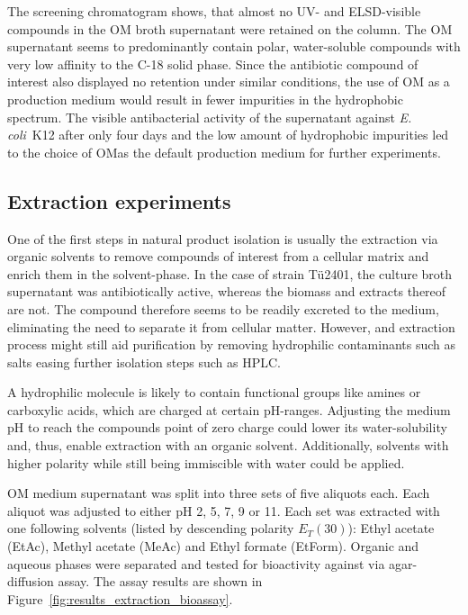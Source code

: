The screening chromatogram shows, that almost no UV- and ELSD-visible compounds in the OM broth supernatant were retained on the column.
The OM supernatant seems to predominantly contain polar, water-soluble compounds with very low affinity to the C-18 solid phase.
Since the antibiotic compound of interest also displayed no retention under similar conditions, the use of OM as a production medium would result in fewer impurities in the hydrophobic spectrum.
The visible antibacterial activity of the supernatant against \textit{E. coli}~K12 after only four days and the low amount of hydrophobic impurities led to the choice of OMas the default production medium for further experiments.

\subsection{Extraction experiments}
\label{sub:extraction_experiments}

One of the first steps in natural product isolation is usually the extraction via organic solvents to remove compounds of interest from a cellular matrix and enrich them in the solvent-phase.\autocite{Dragull2012,Sticher2008}
In the case of strain Tü2401, the culture broth supernatant was antibiotically active, whereas the biomass and extracts thereof are not.
The compound therefore seems to be readily excreted to the medium, eliminating the need to separate it from cellular matter.
However, and extraction process might still aid purification by removing hydrophilic contaminants such as salts easing further isolation steps such as HPLC.

A hydrophilic molecule is likely to contain functional groups like amines or carboxylic acids, which are charged at certain pH-ranges.
Adjusting the medium pH to reach the compounds point of zero charge could lower its water-solubility and, thus, enable extraction with an organic solvent.
Additionally, solvents with higher polarity while still being immiscible with water could be applied.

OM medium supernatant was split into three sets of five aliquots each.
Each aliquot was adjusted to either pH 2, 5, 7, 9 or 11.
Each set was extracted with one following solvents (listed by descending polarity $E_T (30)$):\autocite{Marcus1993}
Ethyl acetate (EtAc), Methyl acetate (MeAc) and Ethyl formate (EtForm).
Organic and aqueous phases were separated and tested for bioactivity against \coli{} via agar-diffusion assay.
The assay results are shown in Figure~\ref{fig:results_extraction_bioassay}.


